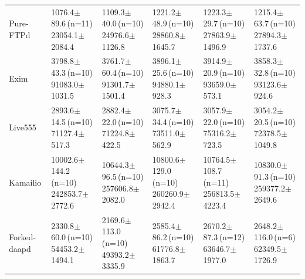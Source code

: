\documentclass[final,5p,times,number]{elsarticle}
\begin{document}
\begin{table}[!tbp]
\begin{tabularx}{\textwidth}{l *{5}{>{\centering\arraybackslash}X}}
\addlinespace[3pt]
Pure-FTPd & \shortstack{1076.4$\pm$89.6\,(n=11)\\23054.1$\pm$2084.4} & \shortstack{1109.3$\pm$40.0\,(n=10)\\24976.6$\pm$1126.8} & \shortstack{1221.2$\pm$48.9\,(n=10)\\28860.8$\pm$1645.7} & \shortstack{1223.3$\pm$29.7\,(n=10)\\27863.9$\pm$1496.9} & \shortstack{1215.4$\pm$63.7\,(n=10)\\27894.3$\pm$1737.6} \\
\addlinespace[3pt]
Exim & \shortstack{3798.8$\pm$43.3\,(n=10)\\91083.0$\pm$1031.5} & \shortstack{3761.7$\pm$60.4\,(n=10)\\91301.7$\pm$1501.4} & \shortstack{3896.1$\pm$25.6\,(n=10)\\94880.1$\pm$928.3} & \shortstack{3914.9$\pm$20.9\,(n=10)\\93659.0$\pm$573.1} & \shortstack{3858.3$\pm$32.8\,(n=10)\\93123.6$\pm$924.6} \\
\addlinespace[3pt]
Live555 & \shortstack{2893.6$\pm$14.5\,(n=10)\\71127.4$\pm$517.3} & \shortstack{2882.4$\pm$22.0\,(n=10)\\71224.8$\pm$422.5} & \shortstack{3075.7$\pm$34.4\,(n=10)\\73511.0$\pm$562.9} & \shortstack{3057.9$\pm$22.0\,(n=10)\\75316.2$\pm$723.5} & \shortstack{3054.2$\pm$20.5\,(n=10)\\72378.5$\pm$1049.8} \\
\addlinespace[3pt]
Kamailio & \shortstack{10002.6$\pm$144.2\,(n=10)\\242853.7$\pm$2772.6} & \shortstack{10644.3$\pm$96.5\,(n=10)\\257606.8$\pm$2082.0} & \shortstack{10800.6$\pm$129.0\,(n=10)\\260260.9$\pm$2942.4} & \shortstack{10764.5$\pm$108.7\,(n=11)\\256813.5$\pm$4223.4} & \shortstack{10830.0$\pm$91.3\,(n=10)\\259377.2$\pm$2649.6} \\
\addlinespace[3pt]
Forked-daapd & \shortstack{2330.8$\pm$60.0\,(n=10)\\54453.2$\pm$1494.1} & \shortstack{2169.6$\pm$113.0\,(n=10)\\49393.2$\pm$3335.9} & \shortstack{2585.4$\pm$86.2\,(n=10)\\61776.8$\pm$1863.7} & \shortstack{2670.2$\pm$87.3\,(n=12)\\63646.7$\pm$1977.0} & \shortstack{2648.2$\pm$116.0\,(n=6)\\62349.5$\pm$1726.9} \\

\end{tabularx}
\end{table}
\end{document}
